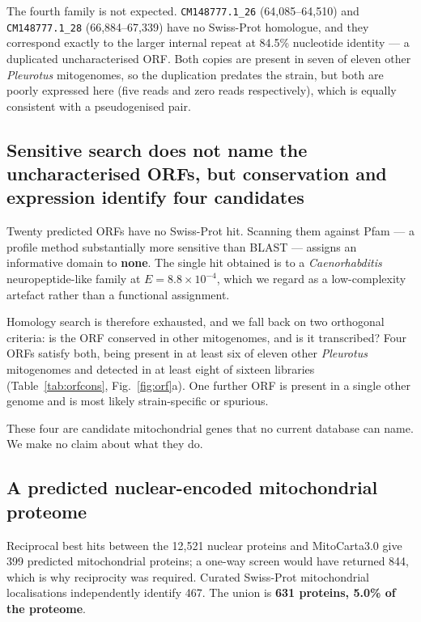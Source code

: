 The fourth family is not expected. \texttt{CM148777.1\_26} (64,085--64,510) and
\texttt{CM148777.1\_28} (66,884--67,339) have no Swiss-Prot homologue, and they correspond
exactly to the larger internal repeat at 84.5\% nucleotide identity --- a duplicated
uncharacterised ORF. Both copies are present in seven of eleven other \textit{Pleurotus}
mitogenomes, so the duplication predates the strain, but both are poorly expressed here (five
reads and zero reads respectively), which is equally consistent with a pseudogenised pair.

\subsection{Sensitive search does not name the uncharacterised ORFs, but conservation and
expression identify four candidates}

Twenty predicted ORFs have no Swiss-Prot hit. Scanning them against Pfam --- a profile method
substantially more sensitive than BLAST --- assigns an informative domain to \textbf{none}. The
single hit obtained is to a \textit{Caenorhabditis} neuropeptide-like family at $E=8.8\times
10^{-4}$, which we regard as a low-complexity artefact rather than a functional assignment.

Homology search is therefore exhausted, and we fall back on two orthogonal criteria: is the ORF
conserved in other mitogenomes, and is it transcribed? Four ORFs satisfy both, being present in
at least six of eleven other \textit{Pleurotus} mitogenomes and detected in at least eight of
sixteen libraries (Table~\ref{tab:orfcons}, Fig.~\ref{fig:orf}a). One further ORF is present in
a single other genome and is most likely strain-specific or spurious.

These four are candidate mitochondrial genes that no current database can name. We make no
claim about what they do.

\subsection{A predicted nuclear-encoded mitochondrial proteome}

Reciprocal best hits between the 12,521 nuclear proteins and MitoCarta3.0 give 399 predicted
mitochondrial proteins; a one-way screen would have returned 844, which is why reciprocity was
required. Curated Swiss-Prot mitochondrial localisations independently identify 467. The union
is \textbf{631 proteins, 5.0\% of the proteome}.

